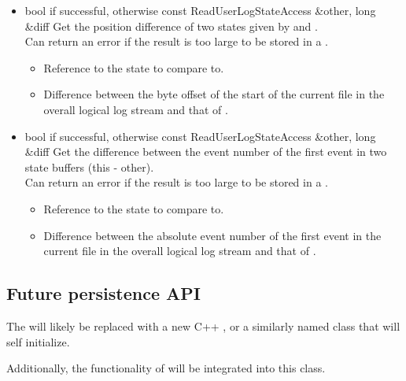 \begin{itemize}
\begin{itemize}
\item {}
  {bool} { if successful,  otherwise}
  {const ReadUserLogStateAccess \&other, long \&diff}
  {Get the position difference of two states given by  
  and .
    \\ \Note Can return an error if the result is too large
    to be stored in a .}
  \begin{itemize}
  \item {}
    Reference to the state to compare to.
  \item {}
    Difference between the byte offset of the start of the current
    file in the overall logical log stream and that of .
  \end{itemize}

\item {}
  {bool} { if successful,  otherwise}
  {const ReadUserLogStateAccess \&other, long \&diff}
  {Get the difference between the event number of the first event in
    two state buffers (this - other).
    \\ \Note Can return an error if the result is too large
    to be stored in a .}
  \begin{itemize}
  \item {}
    Reference to the state to compare to.
  \item {}
    Difference between the absolute event number of the first event in
    the current file in the overall logical log stream and that of
    .
  \end{itemize}

\end{itemize}	%

\end{itemize}

\subsection{Future persistence API}
The  will likely be replaced with a new
C++ , or a similarly named class that
will self initialize.

Additionally, the functionality of  will
be integrated into this class.
